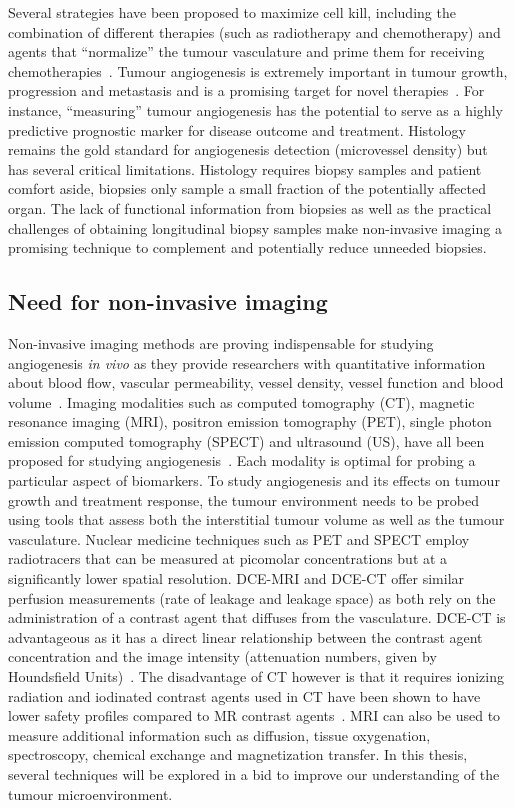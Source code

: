 Several strategies have been proposed to maximize cell kill, including the combination of different therapies (such as radiotherapy and chemotherapy) and agents that ``normalize'' the tumour vasculature and prime them for receiving chemotherapies~\cite{Jain:2005gk}.
Tumour angiogenesis is extremely important in tumour growth, progression and metastasis and is a promising target for novel therapies~\cite{Miles:2000wq}.
For instance, ``measuring'' tumour angiogenesis has the potential to serve as a highly predictive prognostic marker for disease outcome and treatment.
Histology remains the gold standard for angiogenesis detection (microvessel density) but has several critical limitations.
Histology requires biopsy samples and patient comfort aside, biopsies only sample a small fraction of the potentially affected organ.
The lack of functional information from biopsies as well as the practical challenges of obtaining longitudinal biopsy samples make non-invasive imaging a promising technique to complement and potentially reduce unneeded biopsies.

\subsection{Need for non-invasive imaging}
Non-invasive imaging methods are proving indispensable for studying angiogenesis \emph{in vivo} as they provide researchers with quantitative information about blood flow, vascular permeability, vessel density, vessel function and blood volume~\cite{McDonald:2003cm}.
Imaging modalities such as computed tomography (CT), magnetic resonance imaging (MRI), positron emission tomography (PET), single photon emission computed tomography (SPECT) and ultrasound (US), have all been proposed for studying angiogenesis~\cite{Laking:2006ij}.
Each modality is optimal for probing a particular aspect of biomarkers. To study angiogenesis and its effects on tumour growth and treatment response, the tumour environment needs to be probed using tools that assess both the interstitial tumour volume as well as the tumour vasculature.
Nuclear medicine techniques such as PET and SPECT employ radiotracers that can be measured at picomolar concentrations but at a significantly lower spatial resolution.
DCE-MRI and DCE-CT offer similar perfusion measurements (rate of leakage and leakage space) as both rely on the administration of a contrast agent that diffuses from the vasculature.
DCE-CT is advantageous as it has a direct linear relationship between the contrast agent concentration and the image intensity (attenuation numbers, given by Houndsfield Units)~\cite{Cuenod:2006jy}.
The disadvantage of CT however is that it requires ionizing radiation and iodinated contrast agents used in CT have been shown to have lower safety profiles compared to MR contrast agents~\cite{Hasebroock:2009hw}.
MRI can also be used to measure additional information such as diffusion, tissue oxygenation, spectroscopy, chemical exchange and magnetization transfer. 
In this thesis, several techniques will be explored in a bid to improve our understanding of the tumour microenvironment.

